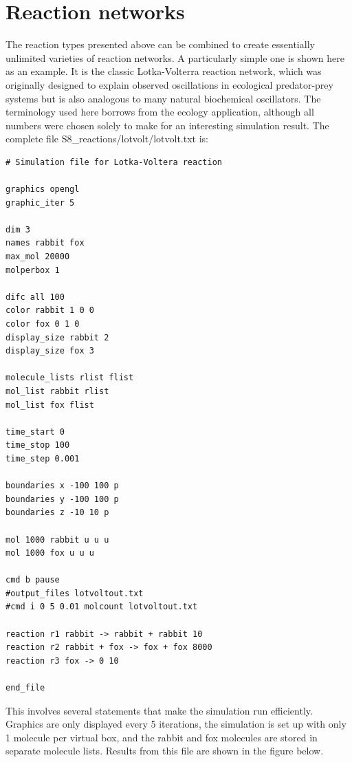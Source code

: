 \documentclass {book}
\begin{document}
\section{Reaction networks}

The reaction types presented above can be combined to create essentially unlimited varieties of reaction networks. A particularly simple one is shown here as an example. It is the classic Lotka-Volterra reaction network, which was originally designed to explain observed oscillations in ecological predator-prey systems but is also analogous to many natural biochemical oscillators. The terminology used here borrows from the ecology application, although all numbers were chosen solely to make for an interesting simulation result. The complete file S8\_reactions/lotvolt/lotvolt.txt is:

\begin{lstlisting}[style=SSAC]
# Simulation file for Lotka-Voltera reaction

graphics opengl
graphic_iter 5

dim 3
names rabbit fox
max_mol 20000
molperbox 1

difc all 100
color rabbit 1 0 0
color fox 0 1 0
display_size rabbit 2
display_size fox 3

molecule_lists rlist flist
mol_list rabbit rlist
mol_list fox flist

time_start 0
time_stop 100
time_step 0.001

boundaries x -100 100 p
boundaries y -100 100 p
boundaries z -10 10 p

mol 1000 rabbit u u u
mol 1000 fox u u u

cmd b pause
#output_files lotvoltout.txt
#cmd i 0 5 0.01 molcount lotvoltout.txt

reaction r1 rabbit -> rabbit + rabbit 10
reaction r2 rabbit + fox -> fox + fox 8000
reaction r3 fox -> 0 10

end_file
\end{lstlisting}

This involves several statements that make the simulation run efficiently. Graphics are only displayed every 5 iterations, the simulation is set up with only 1 molecule per virtual box, and the rabbit and fox molecules are stored in separate molecule lists. Results from this file are shown in the figure below.
\end{document}
